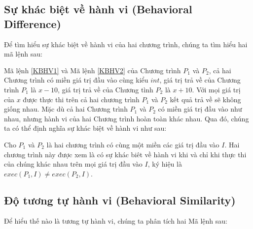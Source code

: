 \subsection{Sự khác biệt về hành vi (Behavioral Difference)}
Để tìm hiểu sự khác biệt về hành vi của hai chương trình, chúng ta tìm hiểu hai mã lệnh sau:

\begin{minipage}[t]{0.45\linewidth}
	
\end{minipage}%
\hfill\vrule\hfill
\begin{minipage}[t]{0.45\linewidth}
	
\end{minipage}%


Mã lệnh \ref{KBHV1} và Mã lệnh \ref{KBHV2}  của Chương trình $P_{1}$ và $P_{2}$, cả hai Chương trình có miền giá trị đầu vào cùng kiểu $int$, giá trị trả về của Chương trình $P_{1}$ là $x - 10$, giá trị trả về của Chương tình $P_{2}$ là $x + 10$. Với mọi giá trị của $x$ được thực thi trên cả hai chương trình $P_{1}$ và $P_{2}$ kết quả trả về sẽ không giống nhau. Mặc dù cả hai Chương trình $P_{1}$ và $P_{2}$ có miền giá trị đầu vào như nhau, nhưng hành vi của hai Chương trình hoàn toàn khác nhau. Qua đó, chúng ta có thể định nghĩa sự khác biệt về hành vi như sau:

\begin{definition}
Cho $P_{1}$ và $P_{2}$ là hai chương trình có cùng một miền các giá trị đầu vào $I$. Hai chương trình này được xem là có sự khác biêt về hành vi khi và chỉ khi thực thi của chúng khác nhau trên mọi giá trị đầu vào $I$, ký hiệu là $exec(P_{1}, I) \neq exec(P_{2}, I)$.
\end{definition}

\subsection{Độ tương tự hành vi (Behavioral Similarity)}
Để hiểu thế nào là tương tự hành vi, chúng ta phân tích hai Mã lệnh sau:

\begin{minipage}[t]{0.45\linewidth}
	
\end{minipage}%
\hfill\vrule\hfill
\begin{minipage}[t]{0.45\linewidth}
	
\end{minipage}%

